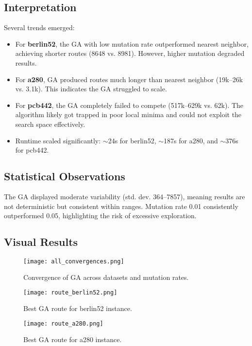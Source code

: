 \documentclass[conference]{IEEEtran}
\begin{document}
\subsection{Interpretation}
Several trends emerged:
\begin{itemize}
    \item For \textbf{berlin52}, the GA with low mutation rate outperformed nearest neighbor, achieving shorter routes (8648 vs. 8981). However, higher mutation degraded results.
    \item For \textbf{a280}, GA produced routes much longer than nearest neighbor (19k–26k vs. 3.1k). This indicates the GA struggled to scale.
    \item For \textbf{pcb442}, the GA completely failed to compete (517k–629k vs. 62k). The algorithm likely got trapped in poor local minima and could not exploit the search space effectively.
    \item Runtime scaled significantly: $\sim$24s for berlin52, $\sim$187s for a280, and $\sim$376s for pcb442.
\end{itemize}

\subsection{Statistical Observations}
The GA displayed moderate variability (std. dev. 364–7857), meaning results are not deterministic but consistent within ranges. Mutation rate 0.01 consistently outperformed 0.05, highlighting the risk of excessive exploration.

\subsection{Visual Results}
\begin{figure}[h]
    \centering
    \texttt{[image: all\_convergences.png]}
    \caption{Convergence of GA across datasets and mutation rates.}
    \label{fig:convergence}
\end{figure}

\begin{figure}[h]
    \centering
    \texttt{[image: route\_berlin52.png]}
    \caption{Best GA route for berlin52 instance.}
    \label{fig:route52}
\end{figure}

\begin{figure}[h]
    \centering
    \texttt{[image: route\_a280.png]}
    \caption{Best GA route for a280 instance.}
    \label{fig:route280}
\end{figure}
\end{document}
